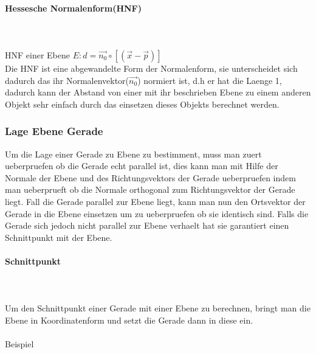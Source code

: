 \documentclass[a4paper]{article} %
\begin{document}
	\paragraph{Hessesche Normalenform(HNF)}
	\hspace{0 cm} \\ \noindent \\
	HNF einer Ebene $E : d = \vec{n_0}\circ\left[\left(\vec{x}-\vec{p}\right)   \right]$\\
	Die HNF ist eine abgewandelte Form der Normalenform, sie unterscheidet sich dadurch das ihr Normalenvektor($\vec{n_0}$)
	normiert ist, d.h er hat die Laenge 1, dadurch kann der Abstand von einer mit ihr beschrieben Ebene zu einem anderen Objekt sehr einfach durch das einsetzen dieses Objekts berechnet werden. 
	\subsubsection{Lage Ebene Gerade}
	Um die Lage einer Gerade zu Ebene zu bestimment, muss man zuert ueberpruefen ob die Gerade echt parallel ist, dies kann man mit Hilfe der Normale der Ebene und des Richtungsvektors der Gerade ueberpruefen indem man ueberprueft ob die Normale orthogonal zum Richtungsvektor der Gerade liegt.
	Fall die Gerade parallel zur Ebene liegt, kann man nun den Ortsvektor der Gerade in die Ebene einsetzen um zu ueberpruefen ob sie identisch sind.
	Falls die Gerade sich jedoch nicht parallel zur Ebene verhaelt hat sie garantiert einen Schnittpunkt mit der Ebene. 
	\paragraph{Schnittpunkt}
		\hspace{0 cm} \\ \noindent \\
		Um den Schnittpunkt einer Gerade mit einer Ebene zu berechnen, bringt man die Ebene in Koordinatenform und setzt die Gerade dann in diese ein.
		\\\\Beispiel
\end{document}
